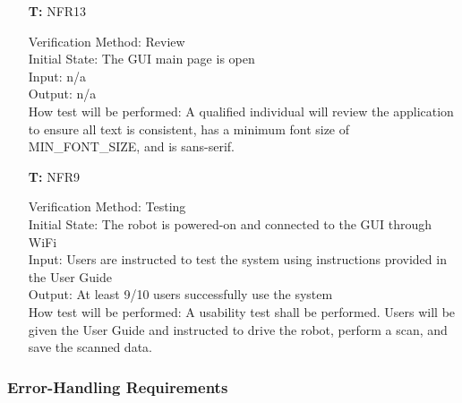 \documentclass[12pt, titlepage]{article}
\newcounter{tnum} %
\begin{document}
\begin{itemize}
\item[\textbf{T\refstepcounter{tnum}\thetnum:}]{NFR13\\}

Verification Method: Review\\					
Initial State: The GUI main page is open\\			
Input: n/a\\
Output: n/a\\
How test will be performed: A qualified individual will review the application to ensure all text is consistent, has a minimum font size of MIN\_FONT\_SIZE, and is sans-serif. \\

\item[\textbf{T\refstepcounter{tnum}\thetnum:}]{NFR9\\}

Verification Method: Testing\\					
Initial State: The robot is powered-on and connected to the GUI through WiFi\\			
Input: Users are instructed to test the system using instructions provided in the User Guide\\
Output: At least 9/10 users successfully use the system\\
How test will be performed: A usability test shall be performed. Users will be given the User Guide and instructed to drive the robot, perform a scan, and save the scanned data.\\ 

\end{itemize}

\subsubsection{Error-Handling Requirements}
\end{document}
